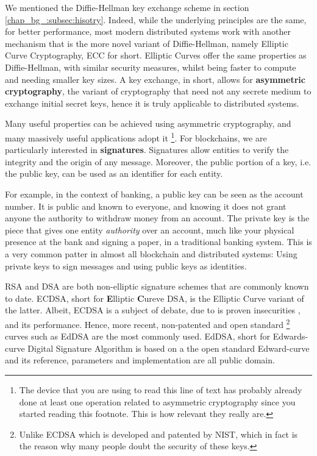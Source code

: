 We mentioned the Diffie-Hellman key exchange scheme in section \ref{chap_bg_:subsec:hisotry}.
Indeed, while the underlying principles are the same, for better performance, most modern
distributed systems work with another mechanism that is the more novel variant of Diffie-Hellman,
namely Elliptic Curve Cryptography, ECC for short. Elliptic Curves offer the same properties as
Diffie-Hellman, with similar security measures, whilst being faster to compute and needing smaller
key sizes. A key exchange, in short, allows for \textbf{asymmetric cryptography}, the variant of
cryptography that need not any secrete medium to exchange initial secret keys, hence it is truly
applicable to distributed systems.

Many useful properties can be achieved using asymmetric cryptography, and many massively useful
applications adopt it \footnote{The device that you are using to read this line of text has probably
already done at least one operation related to asymmetric cryptography since you started reading
this footnote. This is how relevant they really are.}. For blockchains, we are particularly
interested in \textbf{signatures}. Signatures allow entities to verify the integrity and the origin
of any message. Moreover, the public portion of a key, i.e. the public key, can be used as an
identifier for each entity.

For example, in the context of banking, a public key can be seen as the account number. It is public
and known to everyone, and knowing it does not grant anyone the authority to withdraw money from an
account. The private key is the piece that gives one entity \textit{authority} over an account, much
like your physical presence at the bank and signing a paper, in a traditional banking system. This
is a very common patter in almost all blockchain and distributed systems: Using private keys to sign
messages and using public keys as identities.

RSA and DSA are both non-elliptic signature schemes that are commonly known to date. ECDSA, short
for \textbf{E}lliptic \textbf{C}ureve DSA, is the Elliptic Curve variant of the latter. Albeit,
ECDSA is a subject of debate, due to is proven insecurities
\cite{Brumley_Tuveri_2011_remote_timing_ecdsa}, and its performance. Hence, more recent,
non-patented and open standard \footnote{Unlike ECDSA which is developed and patented by NIST, which
in fact is the reason why many people doubt the security of these keys.} curves such as EdDSA are
the most commonly used. EdDSA, short for Edwards-curve Digital Signature Algorithm is based on a the
open standard Edward-curve and its reference, parameters and implementation are all public domain.

